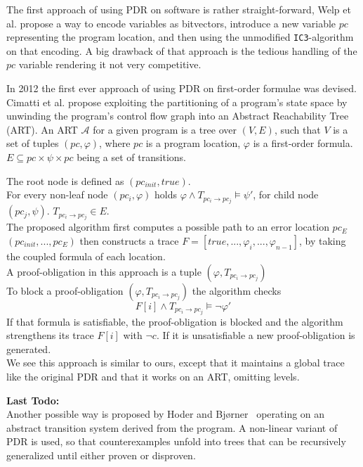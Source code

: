 \documentclass[11pt, a4paper, BCOR=10mm, ngerman]{scrbook}
\begin{document}
The first approach of using PDR on software is rather straight-forward, Welp et al. \cite{DBLP:conf/date/WelpK13} propose a way to encode variables as bitvectors, introduce a new variable $pc$ representing the program location, and then using the unmodified \texttt{IC3}-algorithm on that encoding. A big drawback of that approach is the tedious handling of the $pc$ variable rendering it not very competitive.

In 2012 the first ever approach of using PDR on first-order formulae was devised. Cimatti et al. \cite{DBLP:conf/cav/CimattiG12} propose exploiting the partitioning of a program's state space by unwinding the program's control flow graph into an Abstract Reachability Tree (ART). An ART $\mathcal{A}$ for a given program is a tree over $(V, E)$, such that $V$ is a set of tuples $(pc, \varphi)$, where $pc$ is a program location,  $\varphi$ is a first-order formula. $E \subseteq pc \times \psi \times pc$ being a set of transitions. \par
The root node is defined as $(pc_{init}, true)$. \\ For every non-leaf node $(pc_i, \varphi)$ holds $\varphi \land T_{pc_i \rightarrow pc_j} \models \psi'$, for child node $(pc_j, \psi)$. $T_{pc_i \rightarrow pc_j} \in E$. \\
The proposed algorithm first computes a possible path to an error location $pc_E$ $(pc_{init}, ..., pc_E)$ then constructs a trace $F = [ true, ..., \varphi_i, ..., \varphi_{n-1} ] $, by taking the coupled formula of each location. \\
A proof-obligation in this approach is a tuple $(\varphi, T_{pc_i \rightarrow pc_j})$ \\
To block a proof-obligation $(\varphi, T_{pc_i \rightarrow pc_j})$ the algorithm checks 
\begin{equation*}
F[i] \land T_{pc_i \rightarrow pc_j} \models \neg \varphi'
\end{equation*}
If that formula is satisfiable, the proof-obligation is blocked and the algorithm strengthens its trace $F[i]$ with $\neg c$. If it is unsatisfiable a new proof-obligation is generated. \\
We see this approach is similar to ours, except that it maintains a global trace like the original PDR and that it works on an ART, omitting levels. \par

\textbf{Last Todo:} \\
Another possible way is proposed by Hoder and Bj{\o}rner~\cite{DBLP:conf/sat/HoderB12} operating on an abstract transition system derived from the program. A non-linear variant of PDR is used, so that counterexamples unfold into trees that can be recursively generalized until either proven or disproven.
\end{document}

